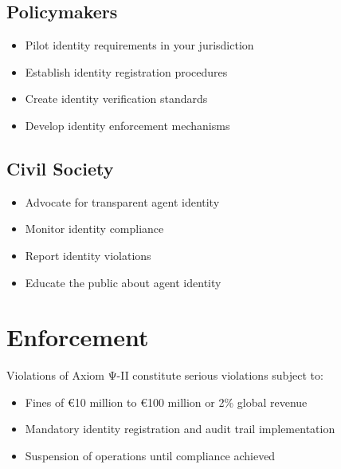 \subsection{Policymakers}

\begin{itemize}
    \item Pilot identity requirements in your jurisdiction
    \item Establish identity registration procedures
    \item Create identity verification standards
    \item Develop identity enforcement mechanisms
\end{itemize}

\subsection{Civil Society}

\begin{itemize}
    \item Advocate for transparent agent identity
    \item Monitor identity compliance
    \item Report identity violations
    \item Educate the public about agent identity
\end{itemize}

\vspace{0.5cm}

\section{Enforcement}

Violations of Axiom Ψ-II constitute serious violations subject to:

\begin{itemize}
    \item Fines of €10 million to €100 million or 2\% global revenue
    \item Mandatory identity registration and audit trail implementation
    \item Suspension of operations until compliance achieved
\end{itemize}

\cleardoublepage
